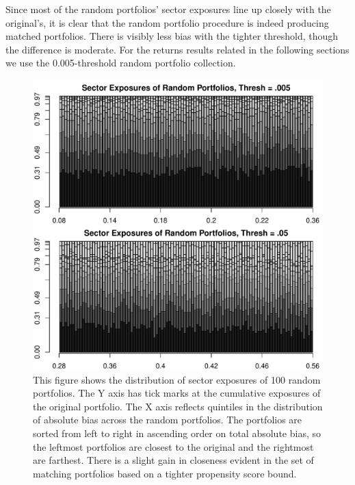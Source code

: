 \documentclass{article}\usepackage{graphicx, color}
\makeatletter
\def\maxwidth{ %
  \ifdim\Gin@nat@width>\linewidth
    \linewidth
  \else
    \Gin@nat@width
  \fi
}
\newenvironment{knitrout}{}{} %
\makeatother
\begin{document}
Since most of the random portfolios' sector exposures line up closely
with the original's, it is clear that the random portfolio procedure
is indeed producing matched portfolios. There is visibly less bias
with the tighter threshold, though the difference is moderate. For the
returns results related in the following sections we use the
0.005-threshold random portfolio collection.

\begin{figure}
\begin{center}
\begin{knitrout}
\color{fgcolor}
\includegraphics[width=\maxwidth]{figure/unnamed-chunk-13} 

\end{knitrout}

\end{center}
\caption{This figure shows the distribution of sector exposures of 100
  random portfolios. The Y axis has tick marks at the cumulative
  exposures of the original portfolio. The X axis reflects quintiles
  in the distribution of absolute bias across the random
  portfolios. The portfolios are sorted from left to right in
  ascending order on total absolute bias, so the leftmost portfolios
  are closest to the original and the rightmost are farthest. There is
  a slight gain in closeness evident in the set of matching portfolios
  based on a tighter propensity score bound.}
\label{FigureRandomPortfolioExposure}
\end{figure}
\end{document}
